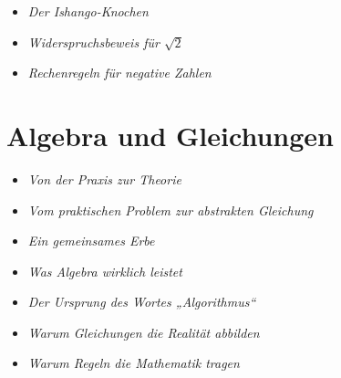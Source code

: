 \begin{HistoryBox}
	
	\begin{itemize}
		\item \emph{Der Ishango-Knochen}\dotfill \pageref{box:ishango}
		
	\end{itemize}
\end{HistoryBox}
\begin{MathBox}
	
	\begin{itemize}
		\item \emph{Widerspruchsbeweis für  $\sqrt{2}$}\dotfill \pageref{box:widerspruch}
			\item \emph{Rechenregeln für negative Zahlen}\dotfill \pageref{box:negative}
	\end{itemize}
\end{MathBox}





\section{Algebra und Gleichungen}
\begin{HistoryBox}
	
	\begin{itemize}
		\item \emph{Von der Praxis zur Theorie}\dotfill \pageref{box:praxis}
			\item \emph{Vom praktischen Problem zur abstrakten Gleichung}\dotfill \pageref{box:abstraktegleichung}
			
	\end{itemize}
\end{HistoryBox}

\begin{NoteBox}[Hinweisboxen]
	
	\begin{itemize}
		\item \emph{Ein gemeinsames Erbe}\dotfill \pageref{box:erben}
		\item \emph{Was Algebra wirklich leistet}\dotfill \pageref{box:allgemeinform}
	\end{itemize}
\end{NoteBox}

\begin{DidacticBox}[Didaktikboxen]
	\begin{itemize}
	\item \emph{Der Ursprung des Wortes „Algorithmus“}\dotfill \pageref{box:ursprung}
	\item \emph{Warum Gleichungen die Realität abbilden}\dotfill \pageref{box:realitaet}
		\item \emph{Warum Regeln die Mathematik tragen}\dotfill \pageref{box:regeln}
\end{itemize}
\end{DidacticBox}


